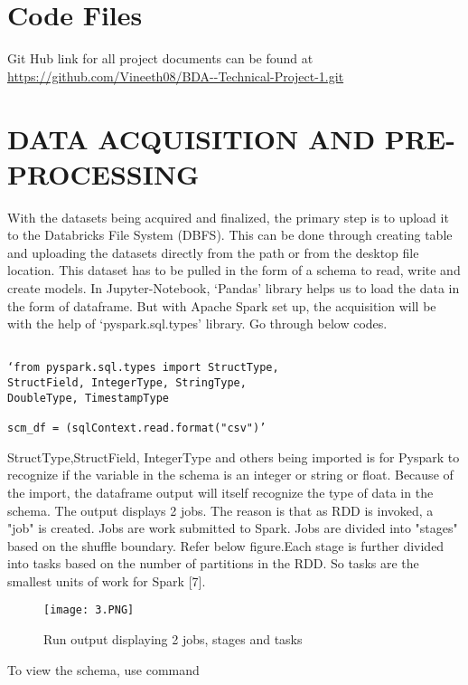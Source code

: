 \documentclass[journal,twoside,web]{ieeecolor}
\begin{document}
\section{Code Files}
Git Hub link  for all project documents can be found at  \url{https://github.com/Vineeth08/BDA--Technical-Project-1.git}

\section{DATA ACQUISITION AND PRE-PROCESSING}
With the datasets being acquired and finalized, the primary step is to upload it to the Databricks File System (DBFS). This can be done through creating table and uploading the datasets directly from the path or from the desktop file location. This dataset has to be pulled in the form of a schema to read, write and create models. In Jupyter-Notebook, ‘Pandas’ library helps us to load the data in the form of dataframe. But with Apache Spark set up, the acquisition will be with the help of ‘pyspark.sql.types’ library.  Go through below codes.

\begin{verbatim}

‘from pyspark.sql.types import StructType,
StructField, IntegerType, StringType,
DoubleType, TimestampType

scm_df = (sqlContext.read.format("csv")’

\end{verbatim}

StructType,StructField, IntegerType and others being imported is for Pyspark to recognize if the variable in the schema is an integer or string or float. Because of the import, the dataframe output will itself recognize the type of data in the schema. The output displays 2 jobs. The reason is that as RDD is invoked, a "job" is created. Jobs are work submitted to Spark. Jobs are divided into "stages" based on the shuffle boundary. Refer below figure.Each stage is further divided into tasks based on the number of partitions in the RDD. So tasks are the smallest units of work for Spark [7]. \\



\begin{figure}[htbp]
\centerline{\texttt{[image: 3.PNG]}}
\caption{Run output displaying 2 jobs, stages and tasks}
\label{fig3 }
\end{figure}

To view the schema, use command 
\end{document}
